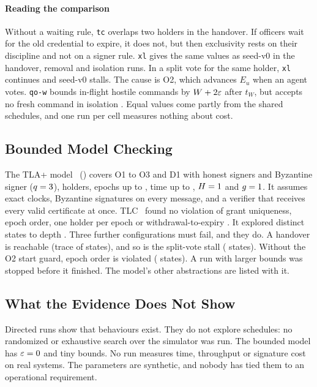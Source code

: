 \paragraph{Reading the comparison}
Without a waiting rule, \texttt{tc} overlaps two holders in the handover. If officers
wait for the old credential to expire, it does not, but then exclusivity rests on their
discipline and not on a signer rule. \texttt{xl} gives the same values as seed-v0 in the
handover, removal and isolation runs. In a split vote for the same holder, \texttt{xl}
continues and seed-v0 stalls. The cause is O2, which advances $E_u$ when an agent votes.
\texttt{qo-w} bounds in-flight hostile commands by $W + 2\varepsilon$ after $t_W$, but accepts no
fresh command in isolation . Equal values come partly from the shared
schedules, and one run per cell measures nothing about cost.

\subsection{Bounded Model Checking}
\label{sec:tla}

The TLA+ model~\cite{tlaplus} () covers O1 to O3 and D1 with
\TlaHonest{} honest signers and \TlaByz{} Byzantine signer ($q = 3$), \TlaHolders{}
holders, epochs up to \TlaMaxEpoch, time up to \TlaMaxTime{}, $H = 1$ and $g = 1$.
It assumes exact clocks, Byzantine signatures on every message, and a verifier that
receives every valid certificate at once. TLC~\TlaVersion{} found no violation of grant
uniqueness, epoch order, one holder per epoch or withdrawal-to-expiry . It explored
\TlaDistinct{} distinct states to depth \TlaDepth. Three further configurations must fail,
and they do. A handover is reachable (trace of \TlaHandoverTrace{} states), and so is the
split-vote stall (\TlaStallTrace{} states). Without the O2 start guard, epoch order is
violated (\TlaBrokenTrace{} states). A run with larger bounds was stopped before it finished. The
model's other abstractions are listed with it.

\subsection{What the Evidence Does Not Show}

Directed runs show that behaviours exist. They do not explore schedules: no randomized
or exhaustive search over the simulator was run. The bounded model has $\varepsilon = 0$ and tiny
bounds. No run measures time, throughput or signature cost on real systems. The
parameters are synthetic, and nobody has tied them to an operational requirement.
